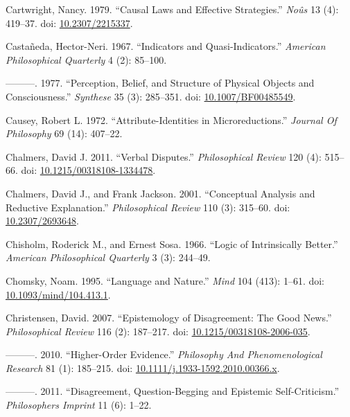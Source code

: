 \documentclass[
  10pt,
  letterpaper,
  DIV=11,
  numbers=noendperiod,
  twoside]{scrartcl}
\newlength{\cslhangindent}
\newenvironment{CSLReferences}[2] %
 {\begin{list}{}{%
  \setlength{\itemindent}{0pt}
  \setlength{\leftmargin}{0pt}
  \setlength{\parsep}{0pt}
  \ifodd #1
   \setlength{\leftmargin}{\cslhangindent}
   \setlength{\itemindent}{-1\cslhangindent}
  \fi
  \setlength{\itemsep}{#2\baselineskip}}}
 {\end{list}}
\begin{document}
\begin{CSLReferences}{1}{0}
Cartwright, Nancy. 1979. {``Causal Laws and Effective Strategies.''}
\emph{Noûs} 13 (4): 419--37. doi:
\href{https://doi.org/10.2307/2215337}{10.2307/2215337}.

Castañeda, Hector-Neri. 1967. {``Indicators and Quasi-Indicators.''}
\emph{American Philosophical Quarterly} 4 (2): 85--100.

---------. 1977. {``Perception, Belief, and Structure of Physical
Objects and Consciousness.''} \emph{Synthese} 35 (3): 285--351. doi:
\href{https://doi.org/10.1007/BF00485549}{10.1007/BF00485549}.

Causey, Robert L. 1972. {``Attribute-Identities in Microreductions.''}
\emph{Journal Of Philosophy} 69 (14): 407--22.

Chalmers, David J. 2011. {``Verbal Disputes.''} \emph{Philosophical
Review} 120 (4): 515--66. doi:
\href{https://doi.org/10.1215/00318108-1334478}{10.1215/00318108-1334478}.

Chalmers, David J., and Frank Jackson. 2001. {``Conceptual Analysis and
Reductive Explanation.''} \emph{Philosophical Review} 110 (3): 315--60.
doi: \href{https://doi.org/10.2307/2693648}{10.2307/2693648}.

Chisholm, Roderick M., and Ernest Sosa. 1966. {``Logic of Intrinsically
Better.''} \emph{American Philosophical Quarterly} 3 (3): 244--49.

Chomsky, Noam. 1995. {``Language and Nature.''} \emph{Mind} 104 (413):
1--61. doi:
\href{https://doi.org/10.1093/mind/104.413.1}{10.1093/mind/104.413.1}.

Christensen, David. 2007. {``Epistemology of Disagreement: The Good
News.''} \emph{Philosophical Review} 116 (2): 187--217. doi:
\href{https://doi.org/10.1215/00318108-2006-035}{10.1215/00318108-2006-035}.

---------. 2010. {``Higher-Order Evidence.''} \emph{Philosophy And
Phenomenological Research} 81 (1): 185--215. doi:
\href{https://doi.org/10.1111/j.1933-1592.2010.00366.x}{10.1111/j.1933-1592.2010.00366.x}.

---------. 2011. {``Disagreement, Question-Begging and Epistemic
Self-Criticism.''} \emph{Philosophers Imprint} 11 (6): 1--22.


\end{CSLReferences}
\end{document}
